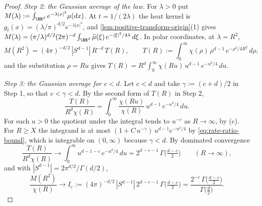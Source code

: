 \begin{proof}
\emph{Step 2: the Gaussian average of the law.} For $\lambda > 0$ put
$M(\lambda) := \int_{\RR^d}e^{-\lambda|x|^2}\mu(dx)$. At $t = 1/(2\lambda)$ the heat kernel is
$g_t(x) = (\lambda/\pi)^{d/2}e^{-\lambda|x|^2}$, and \ref{lem:positive-transform-origin}(1) gives
$M(\lambda) = (\pi/\lambda)^{d/2}(2\pi)^{-d}\int_{\RR^d}\widehat\mu(\xi)\,e^{-|\xi|^2/4\lambda}\,d\xi$.
In polar coordinates, at $\lambda = R^2$,
\begin{equation}\label{eq:rate-gaussian-average}
  M(R^2) = (4\pi)^{-d/2}\,|S^{d-1}|\,R^{-d}\,T(R),
  \qquad
  T(R) := \int_0^\infty \chi(\rho)\,\rho^{d-1}\,e^{-\rho^2/4R^2}\,d\rho ,
\end{equation}
and the substitution $\rho = Ru$ gives
$T(R) = R^{d}\int_0^\infty \chi(Ru)\,u^{d-1}\,e^{-u^2/4}\,du$.

\emph{Step 3: the Gaussian average for $c < d$.} Let $c < d$ and take $\gamma := (c+d)/2$ in
Step 1, so that $c < \gamma < d$. By the second form of $T(R)$ in Step 2,
\[
  \frac{T(R)}{R^{d}\chi(R)} = \int_0^\infty \frac{\chi(Ru)}{\chi(R)}\,u^{d-1}\,e^{-u^2/4}\,du .
\]
For each $u > 0$ the quotient under the integral tends to $u^{-c}$ as $R \to \infty$, by (c). For
$R \ge X$ the integrand is at most $(1 + C\,u^{-\gamma})\,u^{d-1}e^{-u^2/4}$ by
\ref{eq:rate-ratio-bound}, which is integrable on $(0,\infty)$ because $\gamma < d$. By dominated
convergence
\[
  \frac{T(R)}{R^{d}\chi(R)} \to \int_0^\infty u^{d-1-c}\,e^{-u^2/4}\,du
   = 2^{d-c-1}\,\Gamma\bigl(\tfrac{d-c}{2}\bigr) \qquad (R \to \infty),
\]
and with $|S^{d-1}| = 2\pi^{d/2}/\Gamma(d/2)$,
\begin{equation}\label{eq:rate-abelian}
  \frac{M(R^2)}{\chi(R)} \to I_c := (4\pi)^{-d/2}\,|S^{d-1}|\,2^{d-c-1}\,\Gamma\bigl(\tfrac{d-c}{2}\bigr)
   = \frac{2^{-c}\,\Gamma\bigl(\tfrac{d-c}{2}\bigr)}{\Gamma\bigl(\tfrac d2\bigr)} .
\end{equation}


\end{proof}
